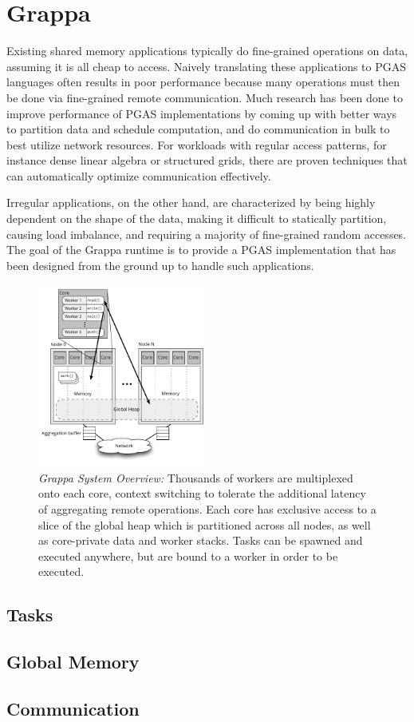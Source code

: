 \section{Grappa}
Existing shared memory applications typically do fine-grained operations on data, assuming it is all cheap to access.
Naively translating these applications to PGAS languages often results in poor performance because many operations must then be done via fine-grained remote communication.
Much research has been done to improve performance of PGAS implementations by coming up with better ways to partition data and schedule computation, and do communication in bulk to best utilize network resources.
For workloads with regular access patterns, for instance dense linear algebra or structured grids, there are proven techniques that can automatically optimize communication effectively. 

Irregular applications, on the other hand, are characterized by being highly dependent on the shape of the data, making it difficult to statically partition, causing load imbalance, and requiring a majority of fine-grained random accesses. The goal of the Grappa runtime is to provide a PGAS implementation that has been designed from the ground up to handle such applications.

\begin{figure}[ht]
  \centering
  \includegraphics[width=0.5\textwidth]{figs/grappa_system.pdf}
  \caption{\emph{Grappa System Overview:}
    Thousands of workers are multiplexed onto each core, context switching to tolerate the additional latency of aggregating remote operations. Each core has exclusive access to a slice of the global heap which is partitioned across all nodes, as well as core-private data and worker stacks. Tasks can be spawned and executed anywhere, but are bound to a worker in order to be executed.
  }
  \label{fig:system}
\end{figure}

\subsection{Tasks}

\subsection{Global Memory}

\subsection{Communication}
